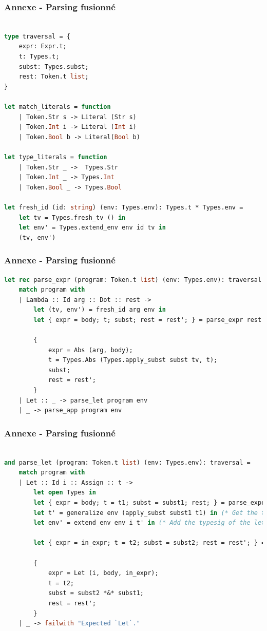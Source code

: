 \documentclass{beamer}
\begin{document}
\begin{frame}[fragile]

		\frametitle{Annexe - Parsing fusionné}
		\begin{lstlisting}[language=ML]

type traversal = {
    expr: Expr.t;
    t: Types.t;
    subst: Types.subst;
    rest: Token.t list;
}

let match_literals = function
    | Token.Str s -> Literal (Str s)
    | Token.Int i -> Literal (Int i)
    | Token.Bool b -> Literal(Bool b)

let type_literals = function
    | Token.Str _ ->  Types.Str
    | Token.Int _ -> Types.Int
    | Token.Bool _ -> Types.Bool

let fresh_id (id: string) (env: Types.env): Types.t * Types.env = 
    let tv = Types.fresh_tv () in
    let env' = Types.extend_env env id tv in
    (tv, env')
		\end{lstlisting}
	
\end{frame}
\begin{frame}[fragile]
		\frametitle{Annexe - Parsing fusionné}
		\begin{lstlisting}[language=ML]
let rec parse_expr (program: Token.t list) (env: Types.env): traversal =
    match program with
    | Lambda :: Id arg :: Dot :: rest ->
        let (tv, env') = fresh_id arg env in
        let { expr = body; t; subst; rest = rest'; } = parse_expr rest env' in 

        {
            expr = Abs (arg, body);
            t = Types.Abs (Types.apply_subst subst tv, t);
            subst;
            rest = rest';
        }
    | Let :: _ -> parse_let program env
    | _ -> parse_app program env
		\end{lstlisting}
	
\end{frame}
\begin{frame}[fragile]
		\frametitle{Annexe - Parsing fusionné}
		\begin{lstlisting}[language=ML]
			
and parse_let (program: Token.t list) (env: Types.env): traversal =
    match program with
    | Let :: Id i :: Assign :: t -> 
        let open Types in
        let { expr = body; t = t1; subst = subst1; rest; } = parse_expr t env in
        let t' = generalize env (apply_subst subst1 t1) in (* Get the type of the let def *)
        let env' = extend_env env i t' in (* Add the typesig of the let-expr to the ctx *)

        let { expr = in_expr; t = t2; subst = subst2; rest = rest'; } = parse_ins rest env' in

        {
            expr = Let (i, body, in_expr);
            t = t2;
            subst = subst2 *&* subst1;
            rest = rest';
        }
    | _ -> failwith "Expected `Let`."
		\end{lstlisting}
	
\end{frame}
\end{document}
